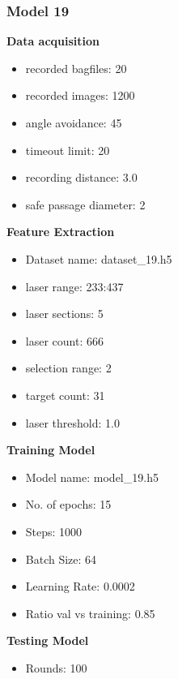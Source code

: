 \subsubsection{Model 19\label{model_19} }
\begin{multicols}{2}\textbf{Data acquisition}
\begin{itemize}
\setlength\itemsep{0.1em}
\item recorded bagfiles: 20
\item recorded images: 1200
\item angle avoidance: 45
\item timeout limit: 20
\item recording distance: 3.0
\item safe passage diameter: 2
\end{itemize}
\textbf{Feature Extraction}
\begin{itemize}
\setlength\itemsep{0.1em}
\item Dataset name: dataset\_19.h5
\item  laser range: 233:437
\item  laser sections: 5
\item  laser count: 666
\item  selection range: 2
\item  target count: 31
\item  laser threshold: 1.0
\end{itemize}
\columnbreak\textbf{Training Model}
\begin{itemize}
\setlength\itemsep{0.1em}
\item  Model name: model\_19.h5
\item  No. of epochs: 15
\item  Steps: 1000
\item  Batch Size: 64
\item  Learning Rate: 0.0002
\item  Ratio val vs training: 0.85
\end{itemize}
\textbf{Testing Model}
\begin{itemize}
\setlength\itemsep{0.1em}
\item Rounds: 100
\newline
\newline
\newline
\newline
\newline
\newline
\newline
\newline
\end{itemize}

\end{multicols}
